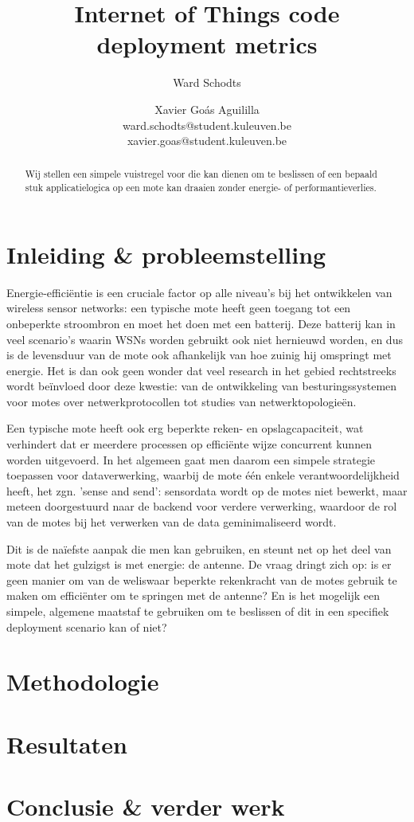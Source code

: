 \documentclass{article}
\title{Internet of Things code deployment metrics}
\author{Ward Schodts \and Xavier Go\'as Aguililla \\ ward.schodts@student.kuleuven.be \\ xavier.goas@student.kuleuven.be}
\begin{document}
\maketitle

\begin{abstract}
Wij stellen een simpele vuistregel voor die kan dienen om te beslissen of een
bepaald stuk applicatielogica op een mote kan draaien zonder energie- of
performantieverlies.
  
\end{abstract}

\section{Inleiding \& probleemstelling}


Energie-effici\"entie is een cruciale factor op alle niveau's bij het
ontwikkelen van wireless sensor networks: een typische mote heeft geen toegang
tot een onbeperkte stroombron en moet het doen met een batterij. Deze batterij
kan in veel scenario's waarin WSNs worden gebruikt ook niet hernieuwd worden, en
dus is de levensduur van de mote ook afhankelijk van hoe zuinig hij omspringt
met energie. Het is dan ook geen wonder dat veel research in het gebied
rechtstreeks wordt be\"invloed door deze kwestie: van de ontwikkeling van
besturingssystemen voor motes over netwerkprotocollen tot studies van
netwerktopologie\"en.

Een typische mote heeft ook erg beperkte reken- en opslagcapaciteit, wat
verhindert dat er meerdere processen op effici\"ente wijze concurrent kunnen
worden uitgevoerd. In het algemeen gaat men daarom een simpele strategie
toepassen voor dataverwerking, waarbij de mote \'e\'en enkele
verantwoordelijkheid heeft, het zgn. 'sense and send': sensordata wordt op de
motes niet bewerkt, maar meteen doorgestuurd naar de backend voor verdere
verwerking, waardoor de rol van de motes bij het verwerken van de data
geminimaliseerd wordt.

Dit is de na\"iefste aanpak die men kan gebruiken, en steunt net op het deel van
mote dat het gulzigst is met energie: de antenne.  De vraag dringt zich op: is
er geen manier om van de weliswaar beperkte rekenkracht van de motes gebruik te
maken om effici\"enter om te springen met de antenne? En is het mogelijk een
simpele, algemene maatstaf te gebruiken om te beslissen of dit in een specifiek
deployment scenario kan of niet?

\section{Methodologie}


\section{Resultaten}
\section{Conclusie \& verder werk}




\end{document}
